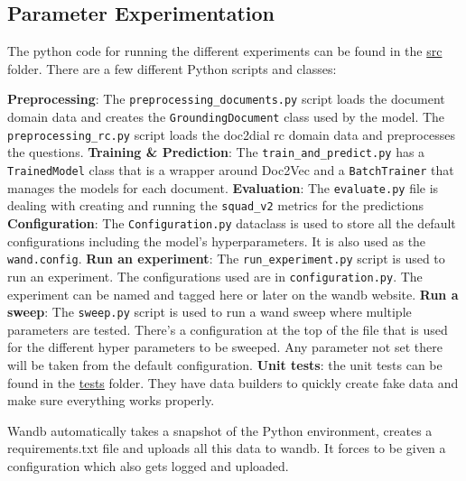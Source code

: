 \documentclass[11pt]{article}
\begin{document}
    \subsection{Parameter Experimentation}\label{subsec:experimentation-experiment}
    The python code for running the different experiments can be found in the \href{https://github.com/isabelladegen/nlp-2021/tree/main/src}{src}
    folder. There are a few different Python scripts and classes:
    \begin{outline}
        \1 \textbf{Preprocessing}: The \texttt{preprocessing\_documents.py} script loads the document domain data and creates the
        \texttt{GroundingDocument} class used by the model. The \texttt{preprocessing\_rc.py} script loads the doc2dial rc
        domain data and preprocesses the questions.
        \1 \textbf{Training \& Prediction}: The \texttt{train\_and\_predict.py} has a \texttt{TrainedModel} class that is a wrapper around
        Doc2Vec and a \texttt{BatchTrainer} that manages the models for each document.
        \1 \textbf{Evaluation}: The \texttt{evaluate.py} file is dealing with creating and running the \texttt{squad\_v2} metrics for the predictions
        \1 \textbf{Configuration}: The \texttt{Configuration.py} dataclass is used to store all the default configurations including
        the model's hyperparameters. It is also used as the \texttt{wand.config}.
        \1 \textbf{Run an experiment}: The \texttt{run\_experiment.py} script is used to run an experiment.
        The configurations used are in \texttt{configuration.py}.
        The experiment can be named and tagged here or later on the wandb website.
        \1 \textbf{Run a sweep}: The \texttt{sweep.py} script is used to run a wand sweep where multiple parameters are tested.
        There's a configuration at the top of the file that is used for the different hyper parameters to be sweeped.
        Any parameter not set there will be taken from the default configuration.
        \1 \textbf{Unit tests}: the unit tests can be found in the \href{https://github.com/isabelladegen/nlp-2021/tree/main/tests}{tests}
        folder. They have data builders to quickly create fake data and make sure everything works properly.
    \end{outline}

    Wandb automatically takes a snapshot of the Python environment, creates a requirements.txt file and uploads all this
    data to wandb. It forces to be given a configuration which also gets logged and uploaded.
\end{document}
